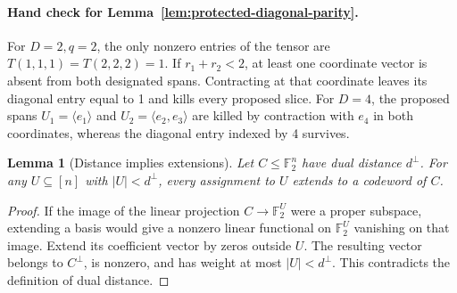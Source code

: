 \documentclass[11pt]{article}
\newtheorem{lemma}[theorem]{Lemma}
\theoremstyle{definition}
\theoremstyle{remark}
\begin{document}
\paragraph{Hand check for Lemma~\ref{lem:protected-diagonal-parity}.}
For $D=2,q=2$, the only nonzero entries of the tensor are
$T(1,1,1)=T(2,2,2)=1$.
If $r_1+r_2<2$, at least one coordinate vector is absent from both
designated spans.  Contracting at that coordinate leaves its diagonal
entry equal to 1 and kills every proposed slice.
For $D=4$, the proposed spans
$U_1=\langle e_1\rangle$ and
$U_2=\langle e_2,e_3\rangle$ are killed by contraction with $e_4$
in both coordinates, whereas the diagonal entry indexed by 4 survives.

\begin{lemma}[Distance implies extensions]
\label{lem:code-extensions-parity}
Let $C\le\mathbb F_2^n$ have dual distance $d^\perp$.
For any $U\subseteq[n]$ with $|U|<d^\perp$, every assignment to $U$
extends to a codeword of $C$.
\end{lemma}
\begin{proof}
If the image of the linear projection $C\to\mathbb F_2^U$ were a
proper subspace, extending a basis would give a nonzero linear
functional on $\mathbb F_2^U$ vanishing on that image.
Extend its coefficient vector by zeros outside $U$.
The resulting vector belongs to $C^\perp$, is nonzero, and has weight
at most $|U|<d^\perp$.  This contradicts the definition of dual distance.
\end{proof}
\end{document}
